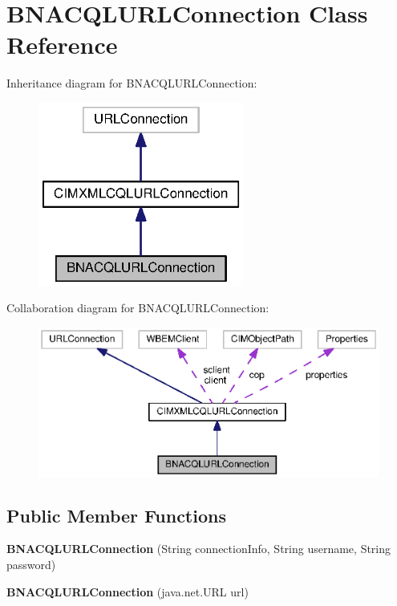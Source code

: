 \section{B\+N\+A\+C\+Q\+L\+U\+R\+L\+Connection Class Reference}
\label{classorg_1_1smallfoot_1_1parser_1_1bnacql_1_1BNACQLURLConnection}


Inheritance diagram for B\+N\+A\+C\+Q\+L\+U\+R\+L\+Connection\+:\nopagebreak
\begin{figure}[H]
\begin{center}
\leavevmode
\includegraphics[width=191pt]{classorg_1_1smallfoot_1_1parser_1_1bnacql_1_1BNACQLURLConnection__inherit__graph}
\end{center}
\end{figure}


Collaboration diagram for B\+N\+A\+C\+Q\+L\+U\+R\+L\+Connection\+:\nopagebreak
\begin{figure}[H]
\begin{center}
\leavevmode
\includegraphics[width=350pt]{classorg_1_1smallfoot_1_1parser_1_1bnacql_1_1BNACQLURLConnection__coll__graph}
\end{center}
\end{figure}
\subsection*{Public Member Functions}
\begin{DoxyCompactItemize}
\item 
{\bf B\+N\+A\+C\+Q\+L\+U\+R\+L\+Connection} (String connection\+Info, String username, String password)
\item 
{\bf B\+N\+A\+C\+Q\+L\+U\+R\+L\+Connection} (java.\+net.\+U\+R\+L url)
\end{DoxyCompactItemize}
